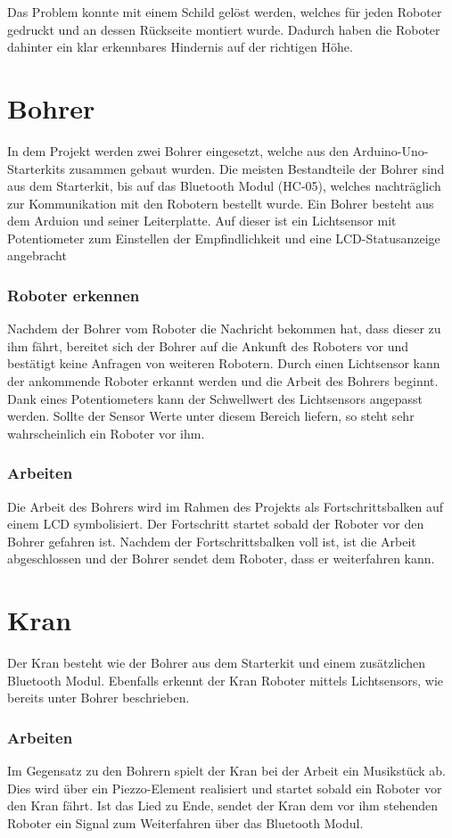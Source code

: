 Das Problem konnte mit einem Schild gelöst werden, welches für jeden Roboter gedruckt und an dessen Rückseite montiert wurde. Dadurch haben die Roboter dahinter ein klar erkennbares Hindernis auf der richtigen Höhe.

\section{Bohrer}
In dem Projekt werden zwei Bohrer eingesetzt, welche aus den Arduino-Uno-Starterkits zusammen gebaut wurden. Die meisten Bestandteile der Bohrer sind aus dem Starterkit, bis auf das Bluetooth Modul (HC-05), welches nachträglich zur Kommunikation mit den Robotern bestellt wurde. Ein Bohrer besteht aus dem Arduion und seiner Leiterplatte. Auf dieser ist ein Lichtsensor mit Potentiometer zum Einstellen der Empfindlichkeit und eine LCD-Statusanzeige angebracht

\subsubsection{Roboter erkennen}
Nachdem der Bohrer vom Roboter die Nachricht bekommen hat, dass dieser zu ihm fährt, bereitet sich der Bohrer auf die Ankunft des Roboters vor und bestätigt keine Anfragen von weiteren Robotern. Durch einen Lichtsensor kann der ankommende Roboter erkannt werden und die Arbeit des Bohrers beginnt. Dank eines Potentiometers kann der Schwellwert des Lichtsensors angepasst werden. Sollte der Sensor Werte unter diesem Bereich liefern, so steht sehr wahrscheinlich ein Roboter vor ihm.

\subsubsection{Arbeiten}
Die Arbeit des Bohrers wird im Rahmen des Projekts als Fortschrittsbalken auf einem LCD symbolisiert. Der Fortschritt startet sobald der Roboter vor den Bohrer gefahren ist. Nachdem der Fortschrittsbalken voll ist, ist die Arbeit abgeschlossen und der Bohrer sendet dem Roboter, dass er weiterfahren kann.

\section{Kran}
Der Kran besteht wie der Bohrer aus dem Starterkit und einem zusätzlichen Bluetooth Modul. Ebenfalls erkennt der Kran Roboter mittels Lichtsensors, wie bereits unter Bohrer beschrieben.
\subsubsection{Arbeiten}
Im Gegensatz zu den Bohrern spielt der Kran bei der Arbeit ein Musikstück ab. Dies wird über ein Piezzo-Element realisiert und startet sobald ein Roboter vor den Kran fährt. Ist das Lied zu Ende, sendet der Kran dem vor ihm stehenden Roboter ein Signal zum Weiterfahren über das Bluetooth Modul.

